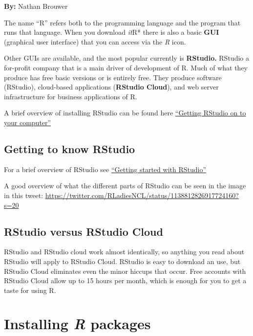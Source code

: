\documentclass[
]{book}
\begin{document}
\textbf{By:} Nathan Brouwer

The name ``R'' refers both to the programming language and the program that runs that language. When you download \emph{it}R* there is also a basic \textbf{GUI} (graphical user interface) that you can access via the \emph{R} icon.

Other GUIs are available, and the most popular currently is \textbf{RStudio.} RStudio a for-profit company that is a main driver of development of R. Much of what they produce has free basic versions or is entirely free. They produce software (RStudio), cloud-based applications (\textbf{RStudio Cloud}), and web server infrastructure for business applications of R.

A brief overview of installing RStudio can be found here \href{https://brouwern.github.io/BOOK_R_Ecological_Data_Science/getting-rstudio-on-to-your-computer.html}{``Getting RStudio on to your computer''}

\hypertarget{getting-to-know-rstudio}{%
\section{Getting to know RStudio}\label{getting-to-know-rstudio}}

For a brief overview of RStudio see \href{https://brouwern.github.io/BOOK_R_Ecological_Data_Science/getting-started-with-rstudio.html}{``Getting started with RStudio''}

A good overview of what the different parts of RStudio can be seen in the image in this tweet: \url{https://twitter.com/RLadiesNCL/status/1138812826917724160?s=20}

\hypertarget{rstudio-versus-rstudio-cloud}{%
\section{RStudio versus RStudio Cloud}\label{rstudio-versus-rstudio-cloud}}

RStudio and RStudio cloud work almost identically, so anything you read about RStudio will apply to RStudio Cloud. RStudio is easy to download an use, but RStudio Cloud eliminates even the minor hiccups that occur. Free accounts with RStudio Cloud allow up to 15 hours per month, which is enough for you to get a taste for using R.

\hypertarget{installing-packages}{%
\chapter{\texorpdfstring{Installing \emph{R} packages}{Installing R packages}}\label{installing-packages}}
\end{document}
